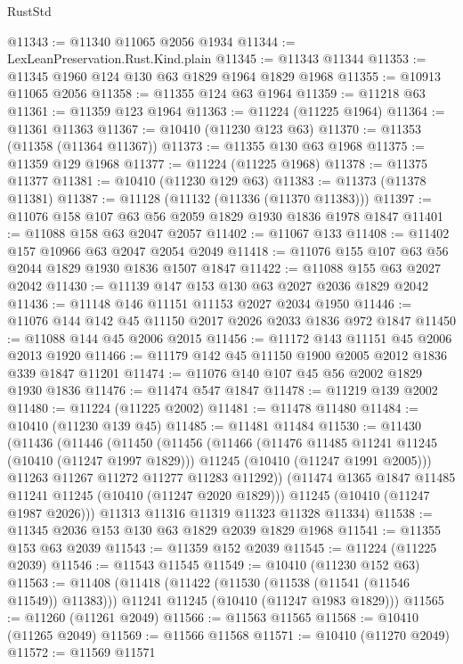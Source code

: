 \begin{lexlean}{RustStd}
\begin{coremodule}
@11343 := @11340 @11065 @2056 @1934
@11344 := LexLeanPreservation.Rust.Kind.plain
@11345 := @11343 @11344
@11353 := @11345 @1960 @124 @130 @63 @1829 @1964 @1829 @1968
@11355 := @10913 @11065 @2056
@11358 := @11355 @124 @63 @1964
@11359 := @11218 @63
@11361 := @11359 @123 @1964
@11363 := @11224 (@11225 @1964)
@11364 := @11361 @11363
@11367 := @10410 (@11230 @123 @63)
@11370 := @11353 (@11358 (@11364 @11367))
@11373 := @11355 @130 @63 @1968
@11375 := @11359 @129 @1968
@11377 := @11224 (@11225 @1968)
@11378 := @11375 @11377
@11381 := @10410 (@11230 @129 @63)
@11383 := @11373 (@11378 @11381)
@11387 := @11128 (@11132 (@11336 (@11370 @11383)))
@11397 := @11076 @158 @107 @63 @56 @2059 @1829 @1930 @1836 @1978 @1847
@11401 := @11088 @158 @63 @2047 @2057
@11402 := @11067 @133
@11408 := @11402 @157 @10966 @63 @2047 @2054 @2049
@11418 := @11076 @155 @107 @63 @56 @2044 @1829 @1930 @1836 @1507 @1847
@11422 := @11088 @155 @63 @2027 @2042
@11430 := @11139 @147 @153 @130 @63 @2027 @2036 @1829 @2042
@11436 := @11148 @146 @11151 @11153 @2027 @2034 @1950
@11446 := @11076 @144 @142 @45 @11150 @2017 @2026 @2033 @1836 @972 @1847
@11450 := @11088 @144 @45 @2006 @2015
@11456 := @11172 @143 @11151 @45 @2006 @2013 @1920
@11466 := @11179 @142 @45 @11150 @1900 @2005 @2012 @1836 @339 @1847 @11201
@11474 := @11076 @140 @107 @45 @56 @2002 @1829 @1930 @1836
@11476 := @11474 @547 @1847
@11478 := @11219 @139 @2002
@11480 := @11224 (@11225 @2002)
@11481 := @11478 @11480
@11484 := @10410 (@11230 @139 @45)
@11485 := @11481 @11484
@11530 := @11430
    (@11436
      (@11446
        (@11450
          (@11456
            (@11466
              (@11476 @11485 @11241 @11245 (@10410 (@11247 @1997 @1829)))
              @11245
              (@10410 (@11247 @1991 @2005)))
            @11263
            @11267
            @11272
            @11277
            @11283
            @11292))
        (@11474 @1365 @1847 @11485 @11241 @11245 (@10410 (@11247 @2020 @1829)))
        @11245
        (@10410 (@11247 @1987 @2026)))
      @11313
      @11316
      @11319
      @11323
      @11328
      @11334)
@11538 := @11345 @2036 @153 @130 @63 @1829 @2039 @1829 @1968
@11541 := @11355 @153 @63 @2039
@11543 := @11359 @152 @2039
@11545 := @11224 (@11225 @2039)
@11546 := @11543 @11545
@11549 := @10410 (@11230 @152 @63)
@11563 := @11408
    (@11418
      (@11422 (@11530 (@11538 (@11541 (@11546 @11549)) @11383)))
      @11241
      @11245
      (@10410 (@11247 @1983 @1829)))
@11565 := @11260 (@11261 @2049)
@11566 := @11563 @11565
@11568 := @10410 (@11265 @2049)
@11569 := @11566 @11568
@11571 := @10410 (@11270 @2049)
@11572 := @11569 @11571

\end{coremodule}
\end{lexlean}
